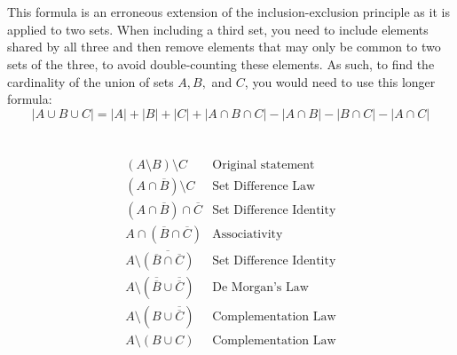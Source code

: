 \documentclass{article}
\begin{document}
\section{}
This formula is an erroneous extension of the inclusion-exclusion principle as it is applied to two sets. When including a third set, you need to include elements shared by all three and then remove elements that may only be common to two sets of the three, to avoid double-counting these elements. As such, to find the cardinality of the union of sets $A, B,$ and $C$, you would need to use this longer formula:
\begin{equation*}
    |A \cup B \cup C| = |A| + |B| + |C| + |A \cap B \cap C| - |A \cap B| - |B \cap C| - |A \cap C|
\end{equation*}

\section{}
\begin{align*}
    & (A \setminus B ) \setminus C & \text{Original statement} & \\
    & (A \cap \overline{B} ) \setminus C & \text{Set Difference Law} & \\
    & (A \cap \overline{B} ) \cap \overline{C} & \text{Set Difference Identity} & \\
    & A \cap (\overline{B}  \cap \overline{C}) & \text{Associativity} & \\
    & A \setminus \overline{(\overline{B}  \cap \overline{C})} & \text{Set Difference Identity} & \\
    & A \setminus (\overline{\overline{B}}  \cup \overline{\overline{C}}) & \text{De Morgan's Law} & \\
    & A \setminus (B  \cup \overline{\overline{C}}) & \text{Complementation Law} & \\
    & A \setminus (B  \cup C) & \text{Complementation Law} &
\end{align*}
\end{document}
